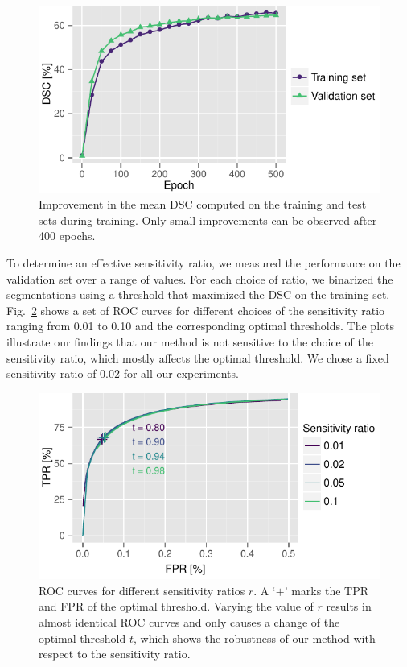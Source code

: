 \begin{figure}
\centering
\includegraphics[width=\textwidth]{figures/tmi/ems_progress}
\caption{Improvement in the mean DSC computed on the training and test sets
during training. Only small improvements can be observed after 400 epochs.}
\label{fig:epochs}
\end{figure}

To determine an effective sensitivity ratio, we measured the performance on the
validation set over a range of values. For each choice of ratio, we binarized
the segmentations using a threshold that maximized the DSC on the training set.
Fig.~\ref{fig:ratio} shows a set of ROC curves for different choices of the
sensitivity ratio ranging from 0.01 to 0.10 and the corresponding optimal
thresholds. The plots illustrate our findings that our method is not sensitive
to the choice of the sensitivity ratio, which mostly affects the optimal
threshold. We chose a fixed sensitivity ratio of 0.02 for all our experiments.

\begin{figure}
\centering
\includegraphics[width=\textwidth]{figures/tmi/roc2}
\caption{ROC curves for different sensitivity ratios $r$. A `$+$' marks the TPR
and FPR of the optimal threshold. Varying the value of $r$ results in almost
identical ROC curves and only causes a change of the optimal threshold $t$,
which shows the robustness of our method with respect to the sensitivity ratio.}
\label{fig:ratio}
\end{figure}

